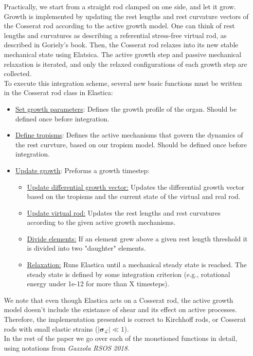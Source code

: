 \documentclass[a4paper, 11pt]{article}
\begin{document}
\noindent Practically, we start from a straight rod clamped on one side, and let it grow. Growth is implemented by updating the rest lengths and rest curvature vectors of the Cosserat rod according to the active growth model. One can think of rest lengths and curvatures as describing a referential stress-free virtual rod, as described in Goriely's book. Then, the Cosserat rod relaxes into its new stable mechanical state using Elatsica. The active growth step and passive mechanical relaxation is iterated, and only the relaxed configurations of each growth step are collected.\\
To execute this integration scheme, several new basic functions must be written in the Cosserat rod class in Elastica:
\begin{itemize}
    \item \underline{Set growth parameters}: Defines the growth profile of the organ. Should be defined once before integration.
    \item \underline{Define tropisms}: Defines the active mechanisms that govern the dynamics of the rest curvture, based on our tropism model. Should be defined once before integration.
    \item \underline{Update growth}: Preforms a growth timestep: 
    \begin{itemize}
        \item \underline{Update differential growth vector:} Updates the differential growth vector based on the tropisms and the current state of the virtual and real rod. 
        \item \underline{Update virtual rod:} Updates the rest lengths and rest curvatures according to the given active growth mechanisms.
        \item \underline{Divide elements:} If an element grew above a given rest length threshold it is divided into two "daughter" elements. 
        \item \underline{Relaxation:} Runs Elastica until a mechanical steady state is reached. The steady state is defined by some integration criterion (e.g., rotational energy under 1e-12 for more than X timesteps).
    \end{itemize}
   
\end{itemize} 
We note that even though Elastica acts on a Cosserat rod, the active growth model doesn't include the existance of shear and its effect on active processes. Therefore, the implementation presented is correct to Kirchhoff rods, or Cosserat rods with small elastic strains ($|\boldsymbol{\sigma}_{\mathcal{L}}|\ll1$). \\
In the rest of the paper we go over each of the monetioned  functions in detail, using notations from \emph{Gazzola RSOS 2018}. 
\end{document}
